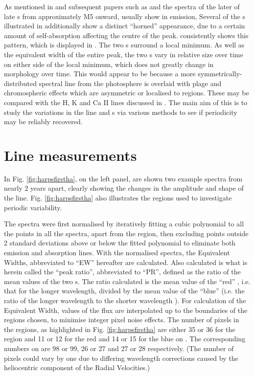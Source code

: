 As mentioned in \citet{mohanty03} and subsequent papers such as \citet{jenkins09} and \citet{barnes14} the spectra of
the later of late \rdwarf s from approximately M5 onward, usually show {\ha} in emission, Several of the \rdwarf s
illustrated in \citet[Fig. 6]{barnes14} additionally show a distinct ``horned'' appearance, due to a certain amount of
self-absorption affecting the centre of the {\ha} peak. {\prox} consistently shows this pattern, which is displayed in
\citet[fig. 14]{fuhrmeister11}. The two \horn s surround a local minimum. As well as the equivalent width of the entire
{\ha} peak, the two \horn s vary in relative size over time on either side of the local minimum, which does not greatly
change in morphology over time. This would appear to be because a more symmetrically-distributed spectral line from the
photosphere is overlaid with plage and chromospheric effects which are asymmetric or localised to regions. These may be
compared with the H, K and Ca II lines discussed in \citet{rauscher06}. The main aim of this {\paperorthesis} is to
study the variations in the line and \horn s via various methods to see if periodicity may be reliably recovered.

\section{{\ha} Line measurements}
\protect\label{section:linemeas}

In Fig. \ref{fig:harpsfirstha}, on the left panel, are shown two example spectra from {\harps} nearly 2 years apart,
clearly showing the changes in the amplitude and shape of the {\ha} line. Fig. \ref{fig:harpsfirstha} also illustrates
the regions used to investigate periodic variability.

The spectra were first normalised by iteratively fitting a cubic polynomial to all the points in all the spectra, apart
from the {\ha} region, then excluding points outside 2 standard deviations above or below the fitted polynomial to
eliminate both emission and absorption lines. With the normalised spectra, the Equivalent Widths, abbreviated to ``EW''
hereafter are calculated. Also calculated is what is herein called the ``peak ratio'', abbreviated to ``PR'', defined as
the ratio of the mean values of the two \horn s. The ratio calculated is the mean value of the ``red'' \horn, i.e. that for the longer
wavelength, divided by the mean value of the ``blue'' {\horn} (i.e. the ratio of the longer wavelength to the shorter
wavelength \horn). For calculation of the Equivalent Width, values of the flux are interpolated up to the boundaries of
the regions chosen, to minimise integer pixel noise effects. The number of pixels in the regions, as highlighted in
Fig. \ref{fig:harpsfirstha} are either 35 or 36 for the {\ha} region and 11 or 12 for the red {\horn} and 14 or 15 for
the blue {\horn} on {\uves}. The corresponding numbers on {\harps} are 98 or 99, 26 or 27 and 27 or 28
respectively. (The number of pixels could vary by one due to differing wavelength corrections caused by the heliocentric
component of the Radial Velocities.)

